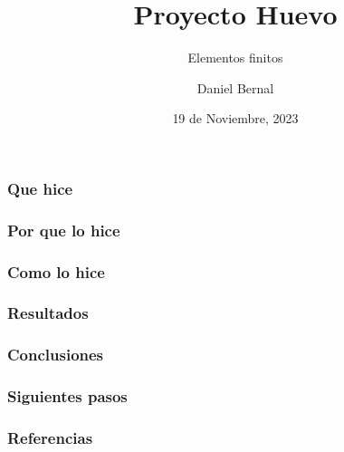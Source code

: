 \documentclass[11pt]{beamer}
\begin{document}
	\author{Daniel Bernal}
	\title{Proyecto Huevo}
	\subtitle{Elementos finitos}
	\date{19 de Noviembre, 2023}
	\begin{frame}[plain]
		\maketitle
	\end{frame}
	
	
	\begin{frame}
		\frametitle{Que hice}
	\end{frame}

	\begin{frame}
		\frametitle{Por que lo hice}
	\end{frame}

	\begin{frame}
		\frametitle{Como lo hice}
	\end{frame}

	\begin{frame}
		\frametitle{Resultados}
	\end{frame}

	\begin{frame}
		\frametitle{Conclusiones}
	\end{frame}

	\begin{frame}
		\frametitle{Siguientes pasos}
	\end{frame}

	\begin{frame}
		\frametitle{Referencias}
	\end{frame}
\end{document}
